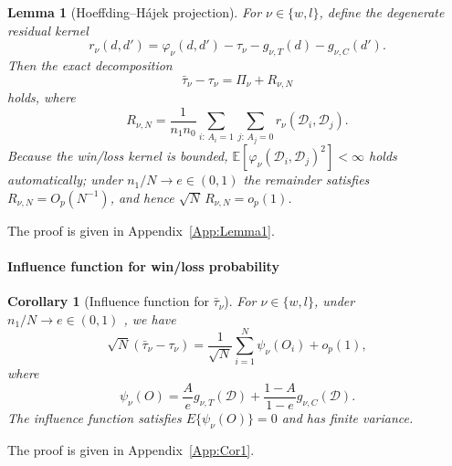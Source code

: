 \documentclass[11pt,a4paper]{article}
\newtheorem{lemma}{Lemma}
\newtheorem{corollary}{Corollary}
\newcommand{\E}{\mathbb{E}}
\newcommand{\op}{o_p}
\newcommand{\Op}{O_p}
\begin{document}
\begin{lemma}[Hoeffding--H\'ajek projection]
\label{lem:hajek}
For $\nu \in \{w, l\}$, define the degenerate residual kernel
\[
r_\nu(d,d')=\varphi_\nu(d,d')-\tau_\nu-g_{\nu,T}(d)-g_{\nu,C}(d').
\]
Then the exact decomposition
\begin{equation}
   \bar{\tau}_\nu-\tau_\nu= \Pi_\nu + R_{\nu,N}
\label{eq:hajek}
\end{equation}
holds, where
\[
R_{\nu,N}=\frac{1}{n_1 n_0}\sum_{i:\,A_i=1}\sum_{j:\,A_j=0}r_\nu(\mathcal{D}_i,\mathcal{D}_j).
\]
Because the win/loss kernel is bounded, $\E[\varphi_\nu(\mathcal{D}_i,\mathcal{D}_j)^2]<\infty$
holds automatically; under $n_1/N\to e\in(0,1)$ the remainder satisfies
$R_{\nu,N}=\Op(N^{-1})$, and hence $\sqrt{N}\,R_{\nu,N}=\op(1)$.
\end{lemma}
The proof is given in Appendix~\ref{App:Lemma1}.

\paragraph{Influence function for win/loss probability}
\begin{corollary}[Influence function for $\bar{\tau}_\nu$]\label{cor:if}
For \(\nu\in\{w,l\}\), under $n_1/N\to e\in(0,1)$ , we have 
\[
\sqrt{N} \left(\bar\tau_\nu-\tau_\nu\right)
=
\frac{1}{\sqrt{N}}\sum_{i=1}^N\psi_\nu(O_i)+o_p(1),
\]
where
\begin{equation}\label{eq:IF_barU}
   \psi_\nu(O) = \frac{A}{e}g_{\nu,T}(\mathcal D) + \frac{1-A}{1-e}g_{\nu,C}(\mathcal D). 
\end{equation}
The influence function satisfies \(E\{\psi_\nu(O)\}=0\) and has finite variance.
\end{corollary}
The proof is given in Appendix~\ref{App:Cor1}.

\end{document}
